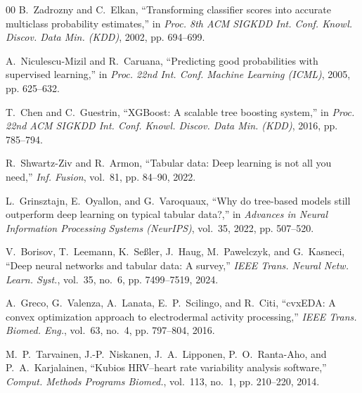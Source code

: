 \documentclass[conference]{IEEEtran}
\begin{document}
\begin{thebibliography}{00}
B.~Zadrozny and C.~Elkan, ``Transforming classifier scores into accurate multiclass probability estimates,'' in \textit{Proc. 8th ACM SIGKDD Int. Conf. Knowl. Discov. Data Min. (KDD)}, 2002, pp. 694--699.

A.~Niculescu-Mizil and R.~Caruana, ``Predicting good probabilities with supervised learning,'' in \textit{Proc. 22nd Int. Conf. Machine Learning (ICML)}, 2005, pp. 625--632.

T.~Chen and C.~Guestrin, ``XGBoost: A scalable tree boosting system,'' in \textit{Proc. 22nd ACM SIGKDD Int. Conf. Knowl. Discov. Data Min. (KDD)}, 2016, pp. 785--794.

R.~Shwartz-Ziv and R.~Armon, ``Tabular data: Deep learning is not all you need,'' \textit{Inf. Fusion}, vol.~81, pp. 84--90, 2022.

L.~Grinsztajn, E.~Oyallon, and G.~Varoquaux, ``Why do tree-based models still outperform deep learning on typical tabular data?,'' in \textit{Advances in Neural Information Processing Systems (NeurIPS)}, vol.~35, 2022, pp. 507--520.

V.~Borisov, T.~Leemann, K.~Se\ss{}ler, J.~Haug, M.~Pawelczyk, and G.~Kasneci, ``Deep neural networks and tabular data: A survey,'' \textit{IEEE Trans. Neural Netw. Learn. Syst.}, vol.~35, no.~6, pp. 7499--7519, 2024.

A.~Greco, G.~Valenza, A.~Lanata, E.~P.~Scilingo, and R.~Citi, ``cvxEDA: A convex optimization approach to electrodermal activity processing,'' \textit{IEEE Trans. Biomed. Eng.}, vol.~63, no.~4, pp. 797--804, 2016.

M.~P.~Tarvainen, J.-P.~Niskanen, J.~A.~Lipponen, P.~O.~Ranta-Aho, and P.~A.~Karjalainen, ``Kubios HRV--heart rate variability analysis software,'' \textit{Comput. Methods Programs Biomed.}, vol.~113, no.~1, pp. 210--220, 2014.
\end{thebibliography}
\end{document}
